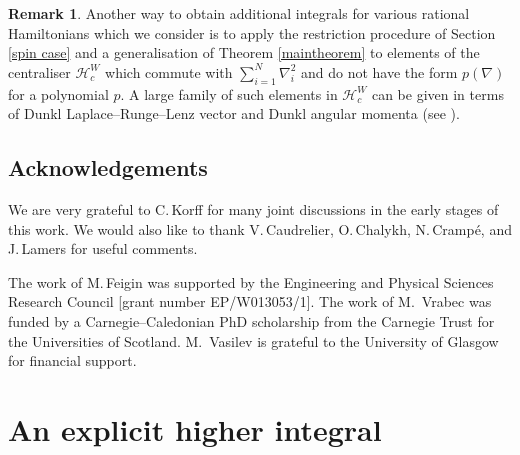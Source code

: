 \documentclass[12pt]{amsart}
\numberwithin{equation}{section}
\theoremstyle{definition}
\newtheorem{remark}[theorem]{Remark}
\begin{document}
\begin{remark}
Another way to obtain additional integrals for various rational Hamiltonians which we consider is to apply the restriction procedure of Section \ref{spin case} and a generalisation of Theorem \ref{maintheorem} to elements of the centraliser ${\mathcal H}_c^W$ which commute with $\sum_{i=1}^N \nabla_i^2$ and do not have the form $p(\nabla)$ for a polynomial $p$. A large family of such elements in ${\mathcal H}_c^W$ can be given in terms of Dunkl Laplace--Runge--Lenz vector and Dunkl angular momenta (see \cite{feiginhakobyan}).

\end{remark}

\subsection*{Acknowledgements}
We are very grateful to C.\,Korff for many joint discussions in the early stages of this work.
We would also like to thank   V.\,Caudrelier, O.\,Chalykh, N.\,Cramp\'e, and J.\,Lamers for useful comments.

The work of M.\,Feigin was supported by the Engineering and Physical Sciences Research Council [grant number  EP/W013053/1]. %
The work of M.~Vrabec was funded by a Carnegie--Caledonian PhD scholarship from the Carnegie Trust for the Universities of Scotland. M.~Vasilev is grateful to the University of Glasgow for financial support. 


\appendix

\section{An explicit higher integral}\label{B_2 integral}
\end{document}

